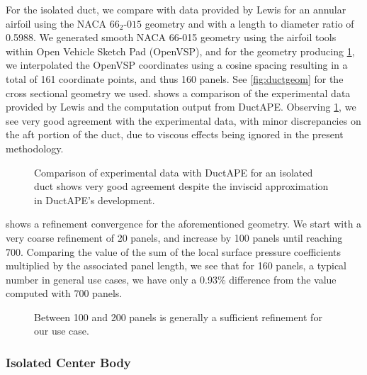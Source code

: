 For the isolated duct, we compare with data provided by Lewis for an annular airfoil using the NACA \(66_2\)-\(015\) geometry and with a length to diameter ratio of 0.5988.
%
We generated smooth NACA 66-015 geometry using the airfoil tools within Open Vehicle Sketch Pad (OpenVSP), and for the geometry producing \cref{fig:isolatedductvalidation}, we interpolated the OpenVSP coordinates using a cosine spacing resulting in a total of 161 coordinate points, and thus 160 panels.
%
See \cref{fig:ductgeom} for the cross sectional geometry we used.
%
 shows a comparison of the experimental data provided by Lewis and the computation output from DuctAPE.
%
Observing \cref{fig:isolatedductvalidation}, we see very good agreement with the experimental data, with minor discrepancies on the aft portion of the duct, due to viscous effects being ignored in the present methodology.

\begin{figure}[h!]
    \centering
        \caption{Comparison of experimental data with DuctAPE for an isolated duct shows very good agreement despite the inviscid approximation in DuctAPE's development.}
    \label{fig:isolatedductvalidation}
\end{figure}

 shows a refinement convergence for the aforementioned geometry.
%
We start with a very coarse refinement of 20 panels, and increase by 100 panels until reaching 700.
%
Comparing the value of the sum of the local surface pressure coefficients multiplied by the associated panel length, we see that for 160 panels, a typical number in general use cases, we have only a 0.93\% difference from the value computed with 700 panels.

\begin{figure}[h!]
    \centering
        \caption{Between 100 and 200 panels is generally a sufficient refinement for our use case.}
    \label{fig:isolatedductgridconv}
\end{figure}


\subsubsection{Isolated Center Body}

